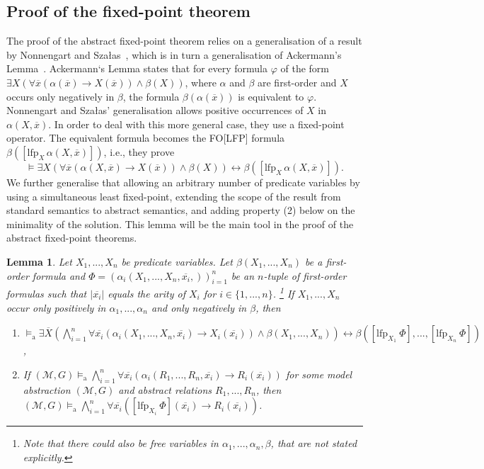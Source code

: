 \documentclass[acmsmall]{acmart}
\theoremstyle{plain}
\newtheorem{lemma}[theorem]{Lemma}
\theoremstyle{definition}
\newcommand{\calM}{\mathcal{M}}
\newcommand{\mybar}[1]{\overline{#1}}
\newcommand{\impl}{\rightarrow} %
\newcommand{\lfp}{\mathrm{lfp}} %
\newcommand{\modelsa}{\models_\mathrm{a}} %
\begin{document}
\subsection{Proof of the fixed-point theorem}
The proof of the abstract fixed-point theorem relies on a generalisation of a result by  Nonnengart
and Sza{\l}as~\cite{Nonnengart98Fixpoint}, which is in turn a generalisation of Ackermann's
Lemma~\cite{Ackermann35Untersuchungen}.
Ackermann`s Lemma states that for every formula $\varphi$ of the form
$\exists X(\forall \mybar{x}(\alpha(\mybar{x})\rightarrow X(\mybar{x}))\wedge \beta(X))$,
where $\alpha$ and $\beta$ are first-order and $X$ occurs only negatively in $\beta$, the formula $\beta(\alpha(\mybar{x}))$ is equivalent to $\varphi$.
Nonnengart and Sza{\l}as' generalisation allows positive occurrences of $X$ in $\alpha(X,\mybar{x})$.
In order to deal with this more general case, they use a fixed-point operator.
The equivalent formula becomes the FO[LFP] formula $\beta([\lfp_X\, \alpha(X,\mybar{x})])$,
 i.e., they prove
\[\models \exists X(\forall \mybar{x}(\alpha(X,\mybar{x})\rightarrow X(\mybar{x}))\wedge \beta(X)) \leftrightarrow \beta([\lfp_X\, \alpha(X,\mybar{x})]).\]
We further generalise that allowing an arbitrary number of predicate variables by using a simultaneous least fixed-point, extending the scope of the result from standard semantics to abstract semantics, and adding property (2) below on the minimality of the solution.
This lemma will be the main tool in the proof of the abstract fixed-point theorems.
%
\begin{lemma}\label{lem.abstractNonnengart}
	Let $X_1,...,X_n$ be predicate variables. Let $\beta(X_1,...,X_n)$ be a first-order formula and $\Phi = (\alpha_i(X_1,...,X_n,\mybar{x_i},))_{i=1}^n$ be an $n$-tuple of first-order formulas such that $|\mybar{x_i}|$ equals the arity of $X_i$ for $i \in \{1,...,n\}$. \footnote{Note that there could also be free variables in $\alpha_1,...,\alpha_n,\beta$, that are not stated explicitly.} If $X_1,...,X_n$ occur only positively in $\alpha_1,...,\alpha_n$ and only negatively in $\beta$, then 
	\begin{enumerate}
		\item $\modelsa \exists \mybar{X} \left(\bigwedge_{i=1}^n \forall \mybar{x_i} \left(\alpha_i(X_1,...,X_n,\mybar{x_i}) \impl X_i(\mybar{x_i})\right) \wedge \beta(X_1,...,X_n) \right) \leftrightarrow \beta([\lfp_{X_1} ~\Phi],...,[\lfp_{X_n} ~\Phi])$,
		\item If  $(\calM,G) \modelsa \bigwedge_{i=1}^n \forall \mybar{x_i} \left(\alpha_i( R_1,...,R_n,\mybar{x_i}) \impl R_i(\mybar{x_i})\right)$ for some model abstraction $(\calM,G)$ and abstract relations $R_1,...,R_n$, then $(\calM,G) \modelsa \bigwedge_{i=1}^n \forall \mybar{x_i} ([\lfp_{X_i} ~\Phi](\mybar{x_i}) \impl R_i(\mybar{x_i}))$.
	\end{enumerate}
\end{lemma}
\end{document}
